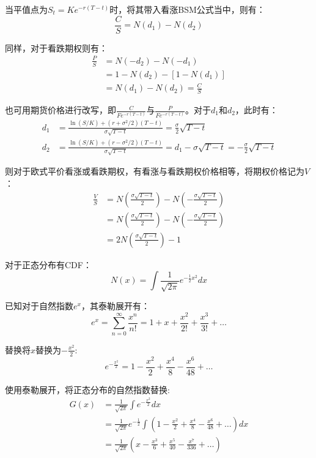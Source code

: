 \documentclass[11pt]{article}
\begin{document}
当平值点为$S_t = K e^{-r(T-t)}$时，将其带入看涨BSM公式当中，则有：
\begin{equation*}
    \frac{C}{S} = N(d_1) - N(d_2)
\end{equation*}

同样，对于看跌期权则有：
\begin{align*}
    \frac{P}{S} & = N(-d_2) - N(-d_1) \\
    & = 1 - N(d_2) - [1-N(d_1)] \\
    & = N(d_1) - N(d_2) = \frac{C}{S}
\end{align*}

也可用期货价格进行改写，即$\frac{C}{Fe^{-r(T-t)}}$与$\frac{P}{Fe^{-r(T-t)}}$。对于$d_1$和$d_2$，此时有：
\begin{align*}
    d_1 &= \frac{\ln(S/K)+(r+\sigma^2/2)(T-t)}{\sigma\sqrt{T-t}} = \frac{\sigma}{2}\sqrt{T-t} \\
    d_2 &= \frac{\ln(S/K)+(r-\sigma^2/2)(T-t)}{\sigma\sqrt{T-t}} = d_1 - \sigma\sqrt{T-t}= -\frac{\sigma}{2}\sqrt{T-t}
\end{align*}

则对于欧式平价看涨或看跌期权，有看涨与看跌期权价格相等，将期权价格记为$V$：
\begin{align*}
    \frac{V}{S} &= N \left( \frac{\sigma\sqrt{T-t}}{2} \right) - N\left( -\frac{\sigma\sqrt{T-t}}{2} \right) \\
    & = N \left( \frac{\sigma\sqrt{T-t}}{2} \right) - N\left( -\frac{\sigma\sqrt{T-t}}{2} \right) \\
    & = 2N\left( \frac{\sigma\sqrt{T-t}}{2} \right) - 1
\end{align*}

对于正态分布有CDF：
\begin{equation*}
   N(x) = \int \frac{1}{\sqrt{2\pi}} e^{-\frac{1}{2}x^2} dx
\end{equation*}

已知对于自然指数$e^x$，其泰勒展开有：
\begin{equation*}
    e^x = \sum^{\infty}_{n=0} \frac{x^n}{n!} = 1 + x + \frac{x^2}{2!} + \frac{x^3}{3!} + \dots
\end{equation*}

替换将$x$替换为$-\frac{x^2}{2}$:
\begin{equation*}
    e^{-\frac{x^2}{2}} = 1 -\frac{x^2}{2}  + \frac{x^4}{8} - \frac{x^6}{48} + \dots
\end{equation*}

使用泰勒展开，将正态分布的自然指数替换:
\begin{align*}
   G(x) &= \frac{1}{\sqrt{2\pi}} \int e^{-\frac{x^2}{2}} dx \\
   &= \frac{1}{\sqrt{2\pi}} e^{-\frac{1}{2}} \int \left( 1 -\frac{x^2}{2}  + \frac{x^4}{8} - \frac{x^6}{48} + \dots \right) dx \\
   &= \frac{1}{\sqrt{2\pi}} \left( x -\frac{x^3}{6} + \frac{x^5}{40} - \frac{x^7}{336} + \dots \right) 
\end{align*}
\end{document}
